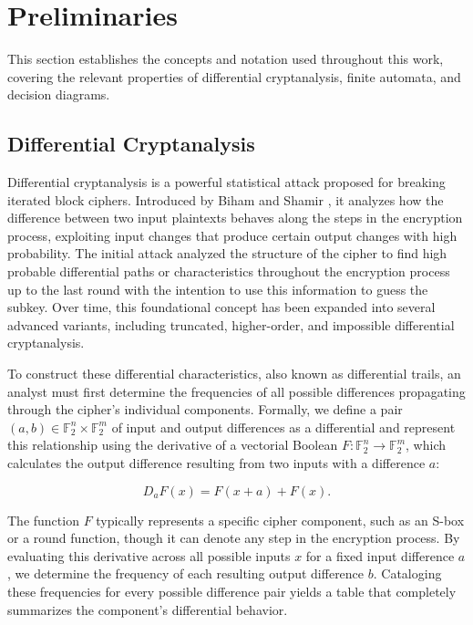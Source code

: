 \section{Preliminaries}
\label{sec:preliminaries}

This section establishes the concepts and notation used throughout this work, covering the relevant properties of differential cryptanalysis, finite automata, and decision diagrams.

\subsection{Differential Cryptanalysis}

Differential cryptanalysis is a powerful statistical attack proposed for breaking iterated block ciphers. Introduced by Biham and Shamir \cite{BihamAndShamir1991}, it analyzes how the difference between two input plaintexts behaves along the steps in the encryption process, exploiting input changes that produce certain output changes with high probability. The initial attack analyzed the structure of the cipher to find high probable differential paths or characteristics throughout the encryption process up to the last round with the intention to use this information to guess the subkey. Over time, this foundational concept has been expanded into several advanced variants, including truncated, higher-order, and impossible differential cryptanalysis.

To construct these differential characteristics, also known as differential trails, an analyst must first determine the frequencies of all possible differences propagating through the cipher's individual components. Formally, we define a pair $(a, b) \in \mathbb{F}_{2}^{n} \times \mathbb{F}_{2}^{m}$ of input and output differences as a differential and represent this relationship using the derivative of a vectorial Boolean  $F : \mathbb{F}_{2} ^{n} \to \mathbb{F}_{2}^{m}$, which calculates the output difference resulting from two inputs with a difference $a$:

\begin{equation}
    \label{eq:derivative}
    D_{a}F(x) = F(x + a) + F(x).
\end{equation}

The function $F$ typically represents a specific cipher component, such as an S-box or a round function, though it can denote any step in the encryption process.  By evaluating this derivative across all possible inputs $x$ for a fixed input difference $a$, we determine the frequency of each resulting output difference $b$. Cataloging these frequencies for every possible difference pair yields a table that completely summarizes the component's differential behavior.

